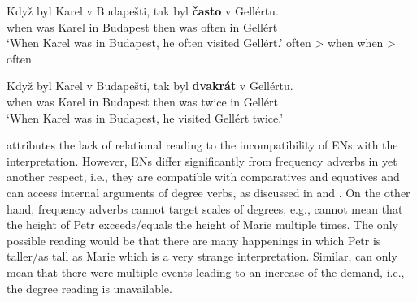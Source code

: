 \documentclass[output=paper,modfonts,hidelinks,newtxmath
\ChapterDOI{10.5281/zenodo.2545513}
]{langscibook}
\begin{document}
\ea\label{casto-(non)relational-reading} \gll Když byl Karel v Budapešti, tak byl \textbf{často} v Gellértu.\\
when was Karel in Budapest then was often in Gellért\\
\glt `When Karel was in Budapest, he often visited Gellért.'
\ea often \textgreater{} when\label{casto-relational-reading}
\ex when \textgreater{} often\label{casto-non-relational-reading}
\z \z

\ea\label{dvakrat-(non)relational-reading} \gll Když byl Karel v Budapešti, tak byl \textbf{dvakrát} v Gellértu.\\
when was Karel in Budapest then was twice in Gellért\\
\glt `When Karel was in Budapest, he visited Gellért twice.'
\z \z

\noindent \cite{doetjes_adverbs_2007} attributes the lack of relational reading to the incompatibility of ENs with the  interpretation. However, ENs differ significantly from frequency adverbs in yet another respect, i.e., they are compatible with comparatives and equatives and can access internal arguments of degree verbs, as discussed in  and . On the other hand, frequency adverbs cannot target scales of degrees, e.g.,  cannot mean that the height of Petr exceeds/equals the height of Marie multiple times. The only possible reading would be that there are many happenings in which Petr is taller/as tall as Marie which is a very strange interpretation. Similar,  can only mean that there were multiple events leading to an increase of the demand, i.e., the degree reading is unavailable.

\z

\z

\begin{table}[b]
\caption{Scopal properties of adverbs of quantification}\label{table:scale}
{}
\end{table}
\end{document}
